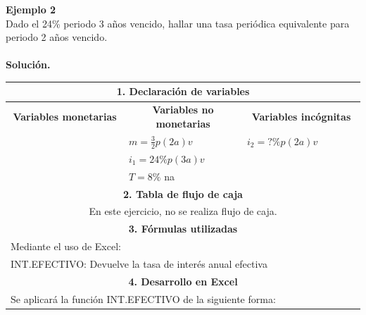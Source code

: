 \textbf{Ejemplo 2}\\
Dado el 24\% periodo 3 años vencido, hallar una tasa periódica equivalente para periodo 2 años vencido.\\ \\
\textbf{Solución.}\\
\begin{center}
 \renewcommand{\arraystretch}{1.5}%
 \begin{longtable}[H]{|p{0.333\linewidth}|p{0.3333\linewidth}|p{0.3333\linewidth}|}
  \hline
  \multicolumn{3}{|c|}{\cellcolor[HTML]{FFB183}\textbf{1. Declaración de variables}}                         \\ \hline
   \multicolumn{1}{|c|}{\cellcolor[HTML]{FFB183}\textbf{Variables monetarias}}                   & \multicolumn{1}{|c|}{\cellcolor[HTML]{FFB183}\textbf{Variables no monetarias}}                   & \multicolumn{1}{|c|}{\cellcolor[HTML]{FFB183}\textbf{Variables incógnitas}}                                                                         \\ \hline
   & $m=\frac{3}{2}p(2a)v$  &  $i_2=?\% p(2a)v$       \\
   & $i_1=24\% p(3a)v$   &                     \\
   & $T=8\% $ na   &                     \\ \hline                                      
  \multicolumn{3}{|c|}{\cellcolor[HTML]{FFB183}\textbf{2. Tabla de flujo de caja}}                           \\ \hline
  \multicolumn{3}{|c|}{En este ejercicio, no se realiza flujo de caja.}                          \\ \hline
  \multicolumn{3}{|c|}{\cellcolor[HTML]{FFB183}\textbf{3. Fórmulas utilizadas}}                              \\ \hline
  \multicolumn{3}{|l|}{Mediante el uso de Excel:}                                                            \\
  \multicolumn{3}{|l|}{INT.EFECTIVO: Devuelve la tasa de interés anual efectiva}                             \\ \hline
  \multicolumn{3}{|c|}{\cellcolor[HTML]{FFB183}\textbf{4. Desarrollo en Excel}}                              \\ \hline
\multicolumn{3}{|l|}{Se aplicará la función INT.EFECTIVO de la siguiente forma:}                             \\

\end{longtable}
\end{center}

